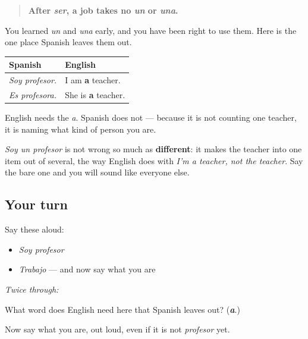 \begin{grammarlens}[title={Grammar Lens: the missing \textquotedblleft{}a\textquotedblright{}}]
\begin{quote}
\textbf{After \emph{ser}, a job takes no \emph{un} or \emph{una}.}
\end{quote}

You learned \emph{un} and \emph{una} early, and you have been right to use them. Here is the one place Spanish leaves them out.

\noindent
\begin{tabularx}{\linewidth}{@{}>{\raggedright\arraybackslash}X>{\raggedright\arraybackslash}X@{}}
\toprule
\textbf{Spanish} & \textbf{English} \\
\midrule
\emph{Soy profesor.} & I am \textbf{a} teacher. \\
\emph{Es profesora.} & She is \textbf{a} teacher. \\
\bottomrule
\end{tabularx}

English needs the \emph{a}. Spanish does not — because it is not counting one teacher, it is naming what kind of person you are.

\emph{Soy un profesor} is not wrong so much as \textbf{different}: it makes the teacher into one item out of several, the way English does with \emph{I'm a teacher, not the teacher}. Say the bare one and you will sound like everyone else.
\end{grammarlens}

\subsection*{Your turn}
Say these aloud:

\begin{itemize}
\raggedright
  \item \emph{Soy profesor}
  \item \emph{Trabajo} — and now say what you are
\end{itemize}

\emph{Twice through:}

\begin{tcolorbox}[breakable,colback=teal!4,colframe=teal!35!black,title={Before you move on}]
What word does English need here that Spanish leaves out? (\emph{\textbf{a}}.)

Now say what you are, out loud, even if it is not \emph{profesor} yet.
\end{tcolorbox}
